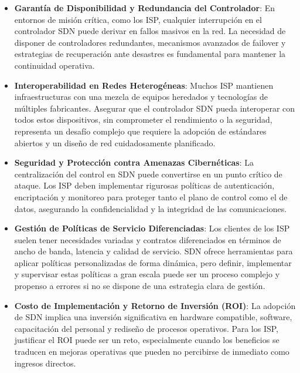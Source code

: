 {\begin{itemize}
                    \item \textbf{Garantía de Disponibilidad y Redundancia del Controlador}: En entornos de misión crítica, como los ISP, cualquier interrupción en el controlador SDN puede derivar en fallos masivos en la red. La necesidad de disponer de controladores redundantes, mecanismos avanzados de failover y estrategias de recuperación ante desastres es fundamental para mantener la continuidad operativa.
                
                    \item \textbf{Interoperabilidad en Redes Heterogéneas}: Muchos ISP mantienen infraestructuras con una mezcla de equipos heredados y tecnologías de múltiples fabricantes. Asegurar que el controlador SDN pueda interoperar con todos estos dispositivos, sin comprometer el rendimiento o la seguridad, representa un desafío complejo que requiere la adopción de estándares abiertos y un diseño de red cuidadosamente planificado.
                
                    \item \textbf{Seguridad y Protección contra Amenazas Cibernéticas}: La centralización del control en SDN puede convertirse en un punto crítico de ataque. Los ISP deben implementar rigurosas políticas de autenticación, encriptación y monitoreo para proteger tanto el plano de control como el de datos, asegurando la confidencialidad y la integridad de las comunicaciones.
                
                    \item \textbf{Gestión de Políticas de Servicio Diferenciadas}: Los clientes de los ISP suelen tener necesidades variadas y contratos diferenciados en términos de ancho de banda, latencia y calidad de servicio. SDN ofrece herramientas para aplicar políticas personalizadas de forma dinámica, pero definir, implementar y supervisar estas políticas a gran escala puede ser un proceso complejo y propenso a errores si no se dispone de una estrategia clara de gestión.
                
                    \item \textbf{Costo de Implementación y Retorno de Inversión (ROI)}: La adopción de SDN implica una inversión significativa en hardware compatible, software, capacitación del personal y rediseño de procesos operativos. Para los ISP, justificar el ROI puede ser un reto, especialmente cuando los beneficios se traducen en mejoras operativas que pueden no percibirse de inmediato como ingresos directos.
                \end{itemize}
                
}
